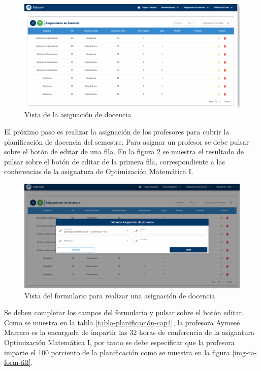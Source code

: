 \begin{figure}[H]
    \includegraphics[scale=0.3]{Graphics/Implementation/Docencia/AD-unassing.png}
    \caption{Vista de la asignación de docencia}
    \label{img-ta-unassing}
\end{figure}


El próximo paso es realizar la asignación de los profesores para cubrir 
la planificación de docencia del semestre. Para asignar un profesor se debe 
pulsar sobre el botón de editar de una fila. En la figura \ref{img-ta-form-empty} se muestra el resultado 
de pulsar sobre el botón de editar de la primera fila, correspondiente a las conferencias
de la asignatura de Optimización Matemática I. 


\begin{figure}[H]
    \includegraphics[scale=0.3]{Graphics/Implementation/Docencia/AD-form-empty}
    \caption{Vista del formulario para realizar una asignación de docencia}
    \label{img-ta-form-empty}
\end{figure}


Se deben completar los campos del formulario y pulsar sobre el botón editar. 
Como se muestra en la tabla \ref{tabla-planificación-cap4}, la profesora Aymeeé Marrero es la encargada de 
impartir las 32 horas de conferencia de la asignatura Optimización Matemática I, por 
tanto se debe especificar que la profesora imparte el 100 porciento de la planificación
como se muestra en la figura \ref{img-ta-form-fill}.


